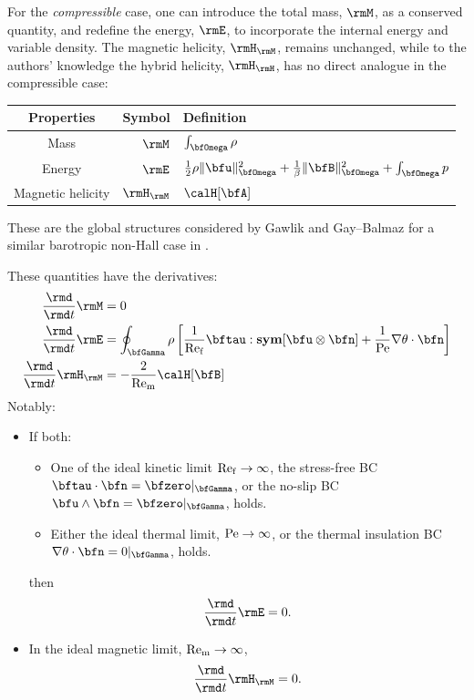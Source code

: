     For the \emph{compressible} case, one can introduce the total mass, $\rmM$, as a conserved quantity, and redefine the energy, $\rmE$, to incorporate the internal energy and variable density. The magnetic helicity, $\rmH_{\rmM}$, remains unchanged, while to the authors' knowledge the hybrid helicity, $\rmH_{\rmH}$, has no direct analogue in the compressible case:
    \begin{center}\begin{tabular}{ c | r : l }
        Properties  &  Symbol  &  Definition  \\
        \hline\hline
        Mass  &  $\rmM$  &  $\int_{\bfOmega}\rho$  \\
        Energy  &  $\rmE$  &  $\frac{1}{2}\rho\|\bfu\|_{\bfOmega}^{2} + \frac{1}{\beta}\|\bfB\|_{\bfOmega}^{2} + \int_{\bfOmega}p$  \\
        \hdashline
        Magnetic helicity \cite{Blackman_2015}  &  $\rmH_{\rmM}$  &  $\calH[\bfA]$
    \end{tabular}\end{center}
    These are the global structures considered by Gawlik and Gay--Balmaz for a similar barotropic non-Hall case in \cite{Gawlik_Gay--Balmaz_2021}.

    These quantities have the derivatives:
    \begin{align}
        \frac{\rmd}{\rmd t}\rmM         &=  0  \\
        \frac{\rmd}{\rmd t}\rmE         &=  \oint_{\bfGamma}\rho\left[\frac{1}{\rmRef}\bftau:\sym[\bfu\otimes\bfn] + \frac{1}{\rmPe}\nabla\theta\cdot\bfn\right]  \\
        \frac{\rmd}{\rmd t}\rmH_{\rmM}  &=  - \frac{2}{\rmRem}\calH[\bfB]
    \end{align}
    Notably:
    \begin{itemize}
        \item  If both:
        \begin{itemize}
            \item  One of the ideal kinetic limit $\mathrm{Re}_{\mathrm{f}}  \rightarrow  \infty$, the stress-free BC $\bftau\cdot\bfn  =  \bfzero|_{\bfGamma}$, or the no-slip BC $\bfu\wedge\bfn  =  \bfzero|_{\bfGamma}$, holds.
            \item  Either the ideal thermal limit, $\mathrm{Pe}  \rightarrow  \infty$, or the thermal insulation BC $\nabla\theta\cdot\bfn  =  0|_{\bfGamma}$, holds.
        \end{itemize}
        then
        \begin{equation}
            \frac{\rmd}{\rmd t}\rmE  =  0.
        \end{equation}

        \item  In the ideal magnetic limit, $\mathrm{Re}_{\mathrm{m}}  \rightarrow  \infty$,
        \begin{equation}
            \frac{\rmd}{\rmd t}\rmH_{\rmM}  =  0.
        \end{equation}
      \end{itemize}

